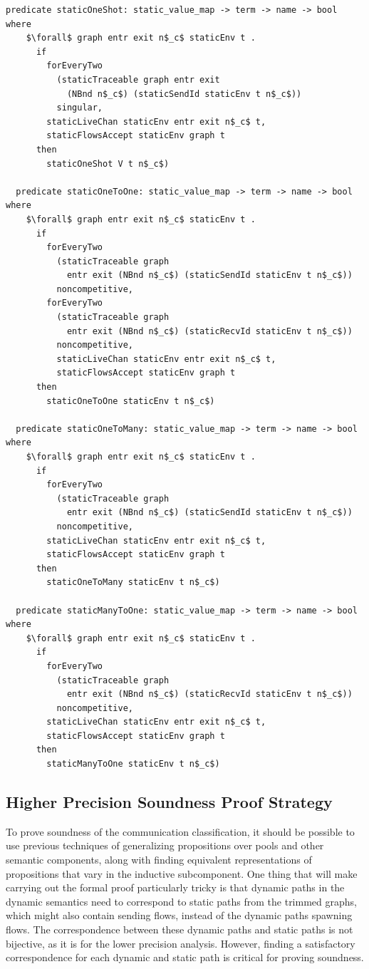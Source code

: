 \documentclass[letterpaper, 11pt]{extarticle}
\begin{document}
\begin{lstlisting}[language=logic, mathescape]
  predicate staticOneShot: static_value_map -> term -> name -> bool where
    $\forall$ graph entr exit n$_c$ staticEnv t . 
      if
        forEveryTwo
          (staticTraceable graph entr exit
            (NBnd n$_c$) (staticSendId staticEnv t n$_c$))
          singular, 
        staticLiveChan staticEnv entr exit n$_c$ t, 
        staticFlowsAccept staticEnv graph t
      then
        staticOneShot V t n$_c$)

  predicate staticOneToOne: static_value_map -> term -> name -> bool where
    $\forall$ graph entr exit n$_c$ staticEnv t .
      if
        forEveryTwo
          (staticTraceable graph
            entr exit (NBnd n$_c$) (staticSendId staticEnv t n$_c$))
          noncompetitive, 
        forEveryTwo
          (staticTraceable graph
            entr exit (NBnd n$_c$) (staticRecvId staticEnv t n$_c$))
          noncompetitive,
          staticLiveChan staticEnv entr exit n$_c$ t,
          staticFlowsAccept staticEnv graph t
      then
        staticOneToOne staticEnv t n$_c$)

  predicate staticOneToMany: static_value_map -> term -> name -> bool where
    $\forall$ graph entr exit n$_c$ staticEnv t .
      if
        forEveryTwo
          (staticTraceable graph
            entr exit (NBnd n$_c$) (staticSendId staticEnv t n$_c$))
          noncompetitive,
        staticLiveChan staticEnv entr exit n$_c$ t,
        staticFlowsAccept staticEnv graph t
      then
        staticOneToMany staticEnv t n$_c$)

  predicate staticManyToOne: static_value_map -> term -> name -> bool where
    $\forall$ graph entr exit n$_c$ staticEnv t .
      if
        forEveryTwo
          (staticTraceable graph
            entr exit (NBnd n$_c$) (staticRecvId staticEnv t n$_c$))
          noncompetitive, 
        staticLiveChan staticEnv entr exit n$_c$ t,
        staticFlowsAccept staticEnv graph t
      then
        staticManyToOne staticEnv t n$_c$)
  \end{lstlisting}


\subsection{Higher Precision Soundness Proof Strategy}
To prove soundness of the communication classification, it should be possible to use
previous techniques of generalizing propositions over pools and other semantic components,
along with finding equivalent representations of propositions that vary in the inductive
subcomponent. One thing that will make carrying out the formal proof particularly tricky is
that dynamic paths in the dynamic semantics need to correspond to static paths from
the trimmed graphs, which might also contain sending flows,
instead of the dynamic paths spawning flows.
The correspondence between these dynamic paths and static paths
is not bijective, as it is for the lower precision analysis. However, finding a satisfactory
correspondence for each dynamic and static path is critical for proving soundness.
\end{document}
